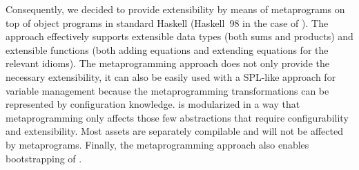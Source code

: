 Consequently, we decided to provide extensibility by means of
metaprograms on top of object programs in standard Haskell (Haskell~98
in the case of \hpl). The approach effectively supports extensible
data types (both sums and products) and extensible functions (both
adding equations and extending equations for the relevant idioms).
The metaprogramming approach does not only provide the necessary
extensibility, it can also be easily used with a SPL-like approach for
variable management because the metaprogramming transformations can be
represented by configuration knowledge. \hpl{} is modularized in a way
that metaprogramming only affects those few abstractions that require
configurability and extensibility. Most assets are separately
compilable and will not be affected by metaprograms.  Finally, the
metaprogramming approach also enables bootstrapping of \hpl.

